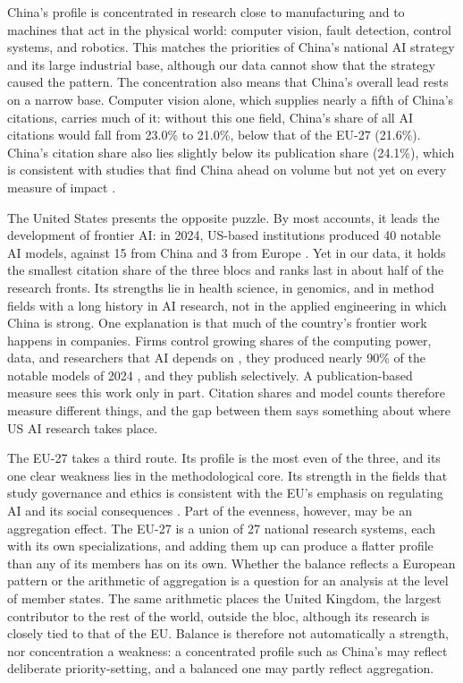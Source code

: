 \documentclass[10pt,twocolumn,a4paper]{article}
\begin{document}
	China's profile is concentrated in research close to manufacturing and to machines that act in the physical world: computer vision, fault detection, control systems, and robotics. This matches the priorities of China's national AI strategy \parencite{roberts2021chinese,khanal2024development} and its large industrial base, although our data cannot show that the strategy caused the pattern. The concentration also means that China's overall lead rests on a narrow base. Computer vision alone, which supplies nearly a fifth of China's citations, carries much of it: without this one field, China's share of all AI citations would fall from 23.0\% to 21.0\%, below that of the EU-27 (21.6\%). China's citation share also lies slightly below its publication share (24.1\%), which is consistent with studies that find China ahead on volume but not yet on every measure of impact \parencite{min2026has}.
	
	The United States presents the opposite puzzle. By most accounts, it leads the development of frontier AI: in 2024, US-based institutions produced 40 notable AI models, against 15 from China and 3 from Europe \parencite{maslej2025artificial}. Yet in our data, it holds the smallest citation share of the three blocs and ranks last in about half of the research fronts. Its strengths lie in health science, in genomics, and in method fields with a long history in AI research, not in the applied engineering in which China is strong. One explanation is that much of the country's frontier work happens in companies. Firms control growing shares of the computing power, data, and researchers that AI depends on \parencite{ahmed2023growing}, they produced nearly 90\% of the notable models of 2024 \parencite{maslej2025artificial}, and they publish selectively. A publication-based measure sees this work only in part. Citation shares and model counts therefore measure different things, and the gap between them says something about where US AI research takes place.
	
	The EU-27 takes a third route. Its profile is the most even of the three, and its one clear weakness lies in the methodological core. Its strength in the fields that study governance and ethics is consistent with the EU's emphasis on regulating AI and its social consequences \parencite{bradford2023digital,balcioglu2025turning}. Part of the evenness, however, may be an aggregation effect. The EU-27 is a union of 27 national research systems, each with its own specializations, and adding them up can produce a flatter profile than any of its members has on its own. Whether the balance reflects a European pattern or the arithmetic of aggregation is a question for an analysis at the level of member states. The same arithmetic places the United Kingdom, the largest contributor to the rest of the world, outside the bloc, although its research is closely tied to that of the EU. Balance is therefore not automatically a strength, nor concentration a weakness: a concentrated profile such as China's may reflect deliberate priority-setting, and a balanced one may partly reflect aggregation.
	
\end{document}
